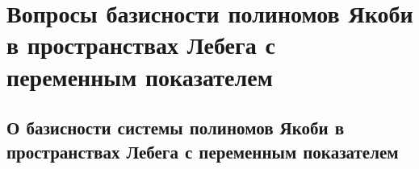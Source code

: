\chapter{Вопросы базисности полиномов Якоби в пространствах Лебега с переменным показателем}



\section{О базисности системы полиномов Якоби в пространствах Лебега с переменным показателем}
